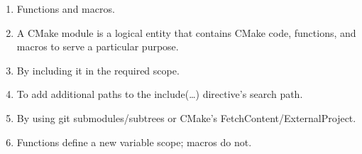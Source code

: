 

\begin{enumerate}
\item 
Functions and macros.

\item
A CMake module is a logical entity that contains CMake code, functions, and macros to serve a particular purpose.

\item 
By including it in the required scope.

\item 
To add additional paths to the include(…) directive's search path.

\item 
By using git submodules/subtrees or CMake's FetchContent/ExternalProject.

\item 
Functions define a new variable scope; macros do not.
\end{enumerate}